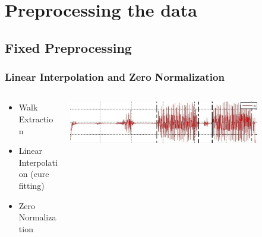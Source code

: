 \documentclass{beamer}
\begin{document}
\section[Preprocessing the data]{Preprocessing the data}


\subsection{Fixed Preprocessing}


\begin{frame}
  \frametitle{Linear Interpolation and Zero Normalization}

  \begin{columns}
  \begin{column}{0.4\textwidth}
  \begin{itemize}
    \item Walk Extraction 
  	\linebreak
  	\item Linear Interpolation (cure fitting)
  	\linebreak
	\item Zero Normalization 
  \end{itemize}
  \end{column}
  \begin{column}{0.8\textwidth}
   \includegraphics[width=0.8\textwidth]{Illustrations/onegaitcycle.png}
       \\
  \end{column}
  \end{columns}
\end{frame}
\end{document}
